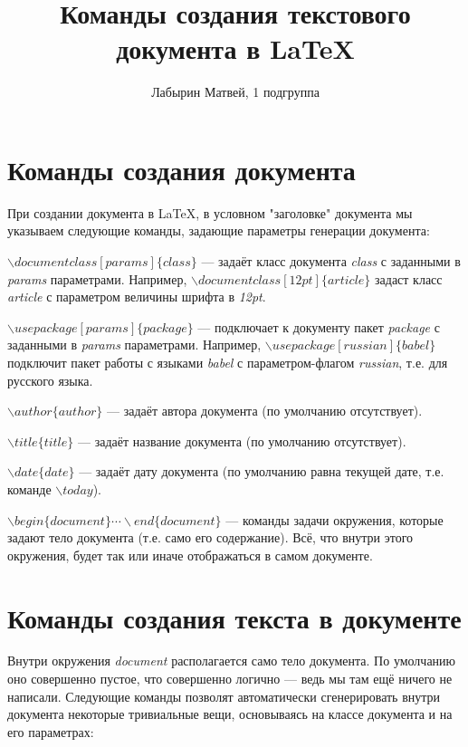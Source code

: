 \documentclass[12pt]{article}
\author{Лабырин Матвей, 1 подгруппа}
\title{Команды создания текстового документа в \LaTeX}
\begin{document}
\maketitle

\tableofcontents

\section{Команды создания документа}

При создании документа в \LaTeX, в условном "заголовке" документа мы указываем следующие команды, задающие параметры генерации документа:

$\backslash documentclass[params]\{class\}$ --- задаёт класс документа \emph{class} с заданными в \emph{params} параметрами.
Например, $\backslash documentclass[12pt]\{article\}$ задаст класс \emph{article} с параметром величины шрифта в \emph{12pt}.

$\backslash usepackage[params]\{package\}$ --- подключает к документу пакет \emph{package} с заданными в \emph{params} параметрами.
Например, $\backslash usepackage[russian]\{babel\}$ подключит пакет работы с языками \emph{babel} с параметром-флагом \emph{russian}, т.е. для русского языка.

$\backslash author\{author\}$ --- задаёт автора документа (по умолчанию отсутствует).

$\backslash title\{title\}$ --- задаёт название документа (по умолчанию отсутствует).

$\backslash date\{date\}$ --- задаёт дату документа (по умолчанию равна текущей дате, т.е. команде $\backslash today$).

$\backslash begin\{document\} \cdots \backslash end\{document\}$ --- команды задачи окружения, которые задают тело документа (т.е. само его содержание). Всё, что внутри этого окружения, будет так или иначе отображаться в самом документе.

\section{Команды создания текста в документе}

Внутри окружения \emph{document} располагается само тело документа.
По умолчанию оно совершенно пустое, что совершенно логично --- ведь мы там ещё ничего не написали.
Следующие команды позволят автоматически сгенерировать внутри документа некоторые тривиальные вещи, основываясь на классе документа и на его параметрах:
\end{document}
